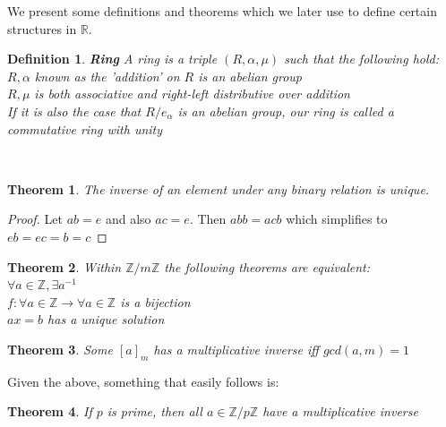 \documentclass[titlepage]{article}
\newtheorem{theorem}{Theorem}[section]
\newtheorem{definition}{Definition}
\begin{document}
We present some definitions and theorems which we later use to define certain structures in $\mathbb{R}$.

\begin{definition}\textbf{Ring}
A ring is a triple $(R,\alpha,\mu)$ such that the following hold:
\\

$R,\alpha$ known as the 'addition' on $R$ is an abelian group 
\\

$R, \mu$ is both associative and right-left distributive over addition
\\

If it is also the case that $R/{e_{\alpha}}$ is an abelian group, our ring is called a \textit{commutative ring with unity}

\end{definition}
\\

\begin{theorem}
The inverse of an element under any binary relation is unique.
\end{theorem}

\begin{proof}
Let $ab = e$ and also $ac=e$. Then $abb=acb$ which simplifies to $eb=ec=b=c$
\end{proof}

\begin{theorem}
Within $\mathbb{Z} / m\mathbb{Z}$ the following theorems are equivalent:
\\

$\forall a \in \mathbb{Z}, \exists a^{-1}$
\\

$f:\forall a \in \mathbb{Z} \to \forall a \in \mathbb{Z}$ is a bijection
\\

$ax=b$ has a unique solution 

\end{theorem}

\begin{theorem}
Some $[a]_{m}$ has a multiplicative inverse iff $gcd(a,m)=1$
\end{theorem}

Given the above, something that easily follows is:

\begin{theorem}
If $p$ is prime, then all $a \in \mathbb{Z}/p\mathbb{Z}$ have a multiplicative inverse 
\end{theorem}
\end{document}
